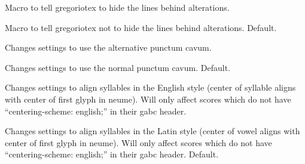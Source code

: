 Macro to tell gregoriotex to hide the lines behind alterations.

Macro to tell gregoriotex not to hide the lines behind alterations.
Default.

Changes settings to use the alternative punctum cavum.

Changes settings to use the normal punctum cavum.  Default.

Changes settings to align syllables in the English style (center of syllable aligns with center of first glyph in neume).  Will only affect scores which do not have “centering-scheme: english;” in their gabc header.

Changes settings to align syllables in the Latin style (center of vowel aligns with center of first glyph in neume).  Will only affect scores which do not have “centering-scheme: english;” in their gabc header.  Default.

